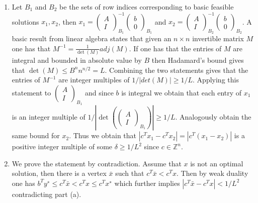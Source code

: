 \documentclass[11pt]{article}
\newcommand{\setZ}{\mathbb{Z}}
\begin{document}
\begin{enumerate}[1)]
\begin{solution}
\begin{enumerate}
\item  Let $B_1$ and $B_2$ be the sets of row indices corresponding to basic feasible solutions $x_1,x_2$, then
$x_1 = \begin{pmatrix} A \\ I \end{pmatrix}_{B_1}^{-1} \begin{pmatrix} b \\ 0 \end{pmatrix}_{B_1}$ and $x_2 = \begin{pmatrix} A \\ I \end{pmatrix}_{B_2}^{-1} \begin{pmatrix} b \\ 0 \end{pmatrix}_{B_2}$.  A basic result from linear algebra states that given an $n×n$ invertible matrix $M$ one has that $M^{−1} =\frac{1}{\det(M)}adj(M)$. If one has that the entries of $M$ are integral and bounded in absolute value by $B$ then Hadamard’s bound gives that $\det(M) ≤ B^n n^{n/2} = L$. Combining the two statements gives that the entries of $M^{−1}$ are integer multiples of
$1/ |det(M)|≥1/L$.  Applying this statement to $\begin{pmatrix} A \\ I \end{pmatrix}_{B_1}$ and since $b$ is integral we obtain that each entry of $x_1$ is an integer multiple of $1/\left|\det\left( \begin{pmatrix} A \\ I \end{pmatrix}_{B_1}\right)\right|≥1/L$. Analogously obtain the same bound for $x_2$. Thus we obtain that $|c^Tx_1−c^Tx_2|= |c^T(x_1−x_2)|$ is a positive integer multiple of some $\delta  ≥1/L^2$ since $c∈\setZ^n$.

\item  We prove the statement by contradiction. Assume that $x$ is not an optimal solution, then there
is a vertex $\bar{x}$ such that $c^T\bar{x}<c^Tx$. Then by weak duality one has $b^Ty^∗≤c^T\bar{x} <c^Tx ≤c^Tx^∗$ which further implies $|c^T\bar{x} −c^Tx|<1/L^2$ contradicting part (a).

\end{enumerate}


\end{solution}



\end{enumerate}



  
\end{document}
